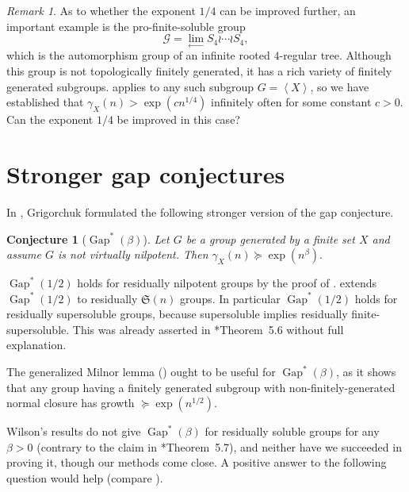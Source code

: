 \documentclass[11pt,reqno]{amsart}
\numberwithin{equation}{section}
\newtheorem*{conjecture}{Conjecture}
\theoremstyle{definition}
\theoremstyle{remark}
\newtheorem*{remark}{Remark}
\newcommand\opr[1]{\operatorname{#1}}
\newcommand\gen[1]{\left\langle#1\right\rangle}
\def\Gap{\opr{Gap}}
\def\FS{\mathfrak{S}}
\numberwithin{equation}{section}
\begin{document}
\begin{remark}
    As to whether the exponent $1/4$ can be improved further, an important example is the pro-finite-soluble group
    \[
        \mathcal G = \lim_{\longleftarrow} S_4 \wr \cdots \wr S_4,
    \]
    which is the automorphism group of an infinite rooted $4$-regular tree.
    Although this group is not topologically finitely generated, it has a rich variety of finitely generated subgroups.
     applies to any such subgroup $G = \gen X$, so we have established that $\gamma_X(n) > \exp(cn^{1/4})$ infinitely often for some constant $c > 0$.
    Can the exponent $1/4$ be improved in this case?
\end{remark}





\section{Stronger gap conjectures}

In \cite{grig-ICM}, Grigorchuk formulated the following stronger version of the gap conjecture.

\begin{conjecture}[$\Gap^*(\beta)$]
    Let $G$ be a group generated by a finite set $X$ and assume $G$ is not virtually nilpotent. Then \(\gamma_X(n) \succeq \exp(n^\beta).\)
\end{conjecture}

$\Gap^*(1/2)$ holds for residually nilpotent groups by the proof of \cites{Grig-gap-for-residually-nilpotent,lubotzky--mann}.  extends $\Gap^*(1/2)$ to residually $\FS(n)$ groups.
In particular $\Gap^*(1/2)$ holds for residually supersoluble groups, because supersoluble implies residually finite-supersoluble.
This was already asserted in \cite{grig-ICM}*{Theorem~5.6} without full explanation.

The generalized Milnor lemma () ought to be useful for $\Gap^*(\beta)$, as it shows that any group having a finitely generated subgroup with non-finitely-generated normal closure has growth $\succeq \exp(n^{1/2})$.

Wilson's results do not give $\Gap^*(\beta)$ for residually soluble groups for any $\beta > 0$ (contrary to the claim in \cite{grig-ICM}*{Theorem~5.7}),
and neither have we succeeded in proving it, though our methods come close.
A positive answer to the following question would help (compare ).
\end{document}
